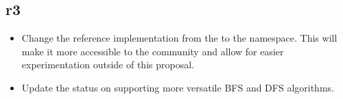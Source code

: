 \subsection*{\paperno r3}
\begin{itemize}
      \item Change the reference implementation from the  to the  namespace. This will
            make it more accessible to the community and allow for easier experimentation outside of this proposal.
      \item Update the status on supporting more versatile BFS and DFS algorithms.
\end{itemize}
